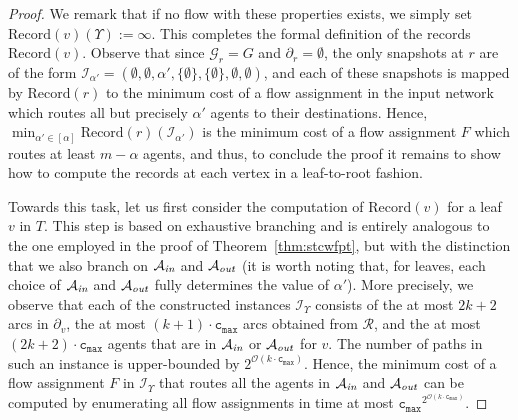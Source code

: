 \documentclass[letterpaper]{article} %
\newcommand{\bigoh}{\ensuremath{{\mathcal O}}}
\newcommand{\cmax}{\mathtt{c_{max}}}
\newcommand{\forgottenG}{\mathcal{G}}
\newcommand{\Rec}{\text{Record}}
\renewcommand{\R}{\mathcal{R}}
\newcommand{\Aout}{\mathcal{A}_\emph{out}}
\newcommand{\Ain}{\mathcal{A}_\emph{in}}
\begin{document}
\begin{proof}
We remark that if no flow with these properties exists, we simply set $\Rec(v)(\Upsilon):=\infty$. This completes the formal definition of the records $\Rec(v)$. Observe that since $\forgottenG_r=G$ and $\partial_r=\emptyset$, the only snapshots at $r$ are of the form $\mathcal{I}_{\alpha'}=(\emptyset,\emptyset,\alpha',\{\emptyset\},\{\emptyset\},\emptyset,\emptyset)$, and each of these snapshots is mapped by $\Rec(r)$ to the minimum cost of a flow assignment in the input network which routes all but precisely $\alpha'$ agents to their destinations. Hence, $\min_{\alpha'\in [\alpha]}\Rec(r)(\mathcal{I}_{\alpha'})$ is the minimum cost of a flow assignment $F$ which routes at least $m-\alpha$ agents, and thus, to conclude the proof
it remains to show how to compute the records at each vertex in a leaf-to-root fashion.

Towards this task, let us first consider the computation of $\Rec(v)$ for a leaf $v$ in $T$. This step is based on exhaustive branching and is entirely analogous to the one employed in the proof of Theorem~\ref{thm:stcwfpt}, but with the distinction that we also branch on $\Ain$ and $\Aout$ (it is worth noting that, for leaves, each choice of $\Ain$ and $\Aout$ fully determines the value of $\alpha'$). More precisely, we observe that each of the constructed instances $\mathcal{I}_\Upsilon$ consists of the at most $2k+2$ arcs in $\partial_v$, the at most $(k+1)\cdot \cmax$ arcs obtained from $\R$, and the at most $(2k+2)\cdot \cmax$ agents that are in $\Ain$ or $\Aout$ for $v$. The number of paths in such an instance is upper-bounded by $2^{\bigoh(k\cdot \cmax)}$. Hence, the minimum cost of a flow assignment $F$ in $\mathcal{I}_\Upsilon$ that routes all the agents in $\Ain$ and $\Aout$ can be computed by enumerating all flow assignments in time at most $\cmax^{2^{\bigoh(k\cdot \cmax)}}$.



\end{proof}
\end{document}
